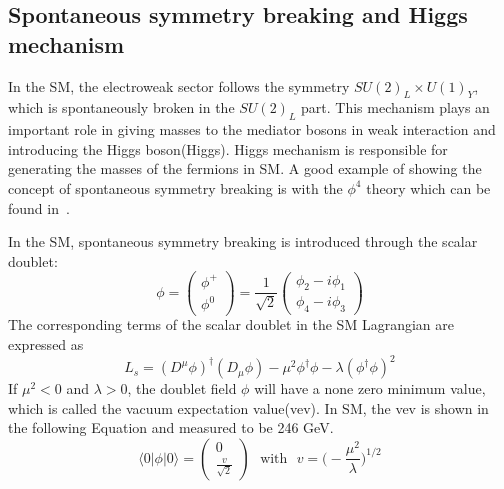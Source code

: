 \subsection{Spontaneous symmetry breaking and Higgs mechanism}

In the SM, the electroweak sector follows the symmetry $SU(2)_{L}\times U(1)_{Y}$, which is spontaneously broken in the $SU(2)_{L}$ part. This mechanism plays an important role in giving masses to the mediator bosons in weak interaction and introducing the Higgs boson(Higgs).  Higgs mechanism is responsible for generating the masses of the fermions in SM. A good example of showing the concept of spontaneous symmetry breaking is with the $\phi^{4}$ theory which can be found in~\cite{Peskin:1995ev}.

In the SM, spontaneous symmetry breaking is introduced through the scalar doublet:
\[
\phi=
\begin{pmatrix}
\phi^{+}\\
\phi^{0}
\end{pmatrix}
=\frac{1}{\sqrt{2}}
\begin{pmatrix}
\phi_{2}-i\phi_{1}\\
\phi_{4}-i\phi_{3}
\end{pmatrix}
\]
The corresponding terms of the scalar doublet in the SM Lagrangian are expressed as
\begin{equation}
L_{s}=(D^{\mu}\phi)^{\dagger}(D_{\mu}\phi)-\mu^{2}\phi^{\dagger}\phi-\lambda(\phi^{\dagger}\phi)^{2}
\end{equation}
If $\mu^{2}<0$ and $\lambda>0$, the doublet field $\phi$ will have a none zero minimum value, which is called the vacuum expectation value(vev). In SM, the vev is shown in the following Equation and measured to be 246 GeV.
\begin{equation}\label{vev}
\langle 0 | \phi | 0 \rangle   =
\begin{pmatrix}
0\\
\frac{v}{\sqrt{2}}
\end{pmatrix}
~~~\textrm{with} ~~~  v=
\bigg(-\frac{\mu^{2}}{\lambda}\bigg)^{1/2}
\end{equation}

